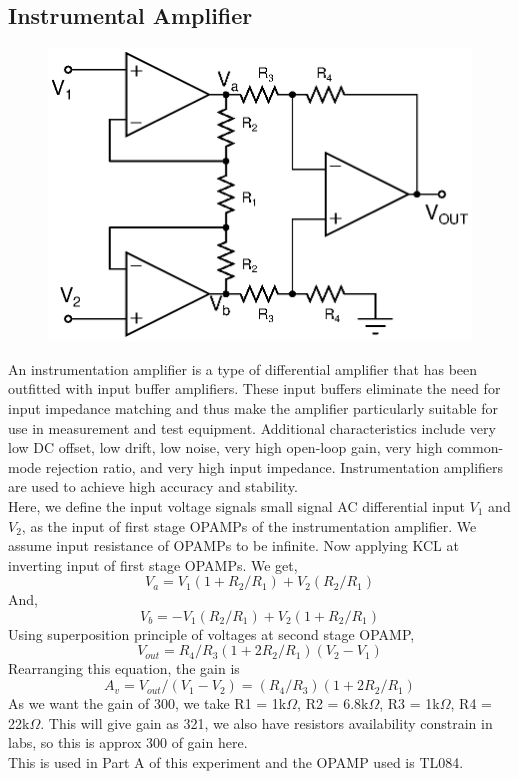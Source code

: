 \documentclass[12pt]{article}
\begin{document}
\subsection{Instrumental Amplifier}
\begin{figure}[H]
\begin{center}
\includegraphics[scale = 0.8]{Lab9-a.eps}
\end{center}
\end{figure}
An instrumentation amplifier is a type of differential amplifier that has been outfitted with input buffer amplifiers. These input buffers eliminate the need for input impedance matching and thus make the amplifier particularly suitable for use in measurement and test equipment. Additional characteristics include very low DC offset, low drift, low noise, very high open-loop gain, very high common-mode rejection ratio, and very high input impedance. Instrumentation amplifiers are used to achieve high accuracy and stability. \\
Here, we define the input voltage signals small signal AC differential input $V_1$ and $V_2$, as the input of first stage OPAMPs of the instrumentation amplifier. We assume input resistance of OPAMPs to be infinite. Now applying KCL at inverting input of first stage OPAMPs. We get,
\begin{equation}
   V_a = V_1(1 + R_2/R_1) + V_2(R_2/R_1)
 \end{equation}
And,
\begin{equation}
   V_b = -V_1(R_2/R_1) + V_2(1 + R_2/R_1)
 \end{equation}
Using superposition principle of voltages at second stage OPAMP,
\begin{equation}
  V_{out} = R_4/R_3(1 + 2R_2/R_1)(V_2 - V_1)
 \end{equation}
Rearranging this equation, the gain is
\begin{equation}
  A_v = V_{out}/(V_1 - V_2) = (R_4/R_3)(1 + 2R_2/R_1)
 \end{equation}
As we want the gain of 300, we take R1 = 1k$\Omega $, R2 = 6.8k$\Omega $, R3 = 1k$\Omega $, R4 = 22k$\Omega $. This will give gain as 321, we also have resistors availability constrain in labs, so this is approx 300 of gain here.\\
This is used in Part A of this experiment and the OPAMP used is TL084.
\end{document}
